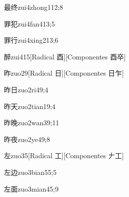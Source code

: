 \begin{verbete}{最终}{zui4zhong1}{12;8}
\end{verbete}

\begin{verbete}{罪犯}{zui4fan4}{13;5}
\end{verbete}

\begin{verbete}{罪行}{zui4xing2}{13;6}
\end{verbete}

\begin{verbete}{醉}{zui4}{15}[Radical 酉][Componentes 酉卒]
\end{verbete}

\begin{verbete}{昨}{zuo2}{9}[Radical 日][Componentes 日乍]
\end{verbete}

\begin{verbete}{昨日}{zuo2ri4}{9;4}
\end{verbete}

\begin{verbete}{昨天}{zuo2tian1}{9;4}
\end{verbete}

\begin{verbete}{昨晚}{zuo2wan3}{9;11}
\end{verbete}

\begin{verbete}{昨夜}{zuo2ye4}{9;8}
\end{verbete}

\begin{verbete}{左}{zuo3}{5}[Radical 工][Componentes 𠂇工]
\end{verbete}

\begin{verbete}{左边}{zuo3bian5}{5;5}
\end{verbete}

\begin{verbete}{左面}{zuo3mian4}{5;9}
\end{verbete}

